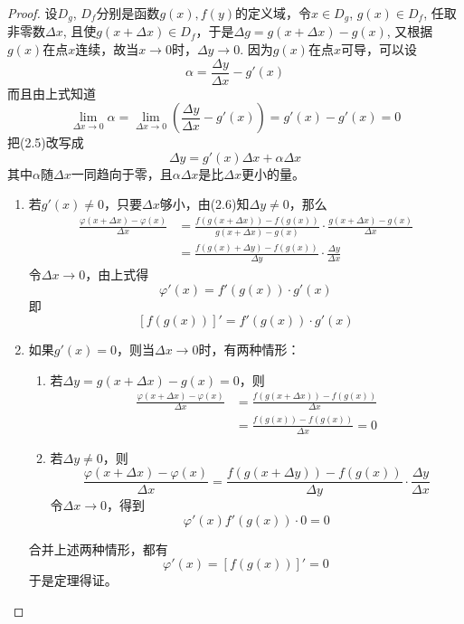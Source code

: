 \begin{proof}
    设$D_g$, $D_f$分别是函数$g(x),f(y)$的定义域，令$x\in D_g$, $g(x)\in D_f$, 任取非零数$\Delta x$, 且使$g(x+\Delta x)\in D_f$，于是$\Delta g=g(x+\Delta x)-g(x)$, 又根据$g(x)$在点$x$连续，故当$x\to 0$时，$\Delta y\to 0$. 因为$g(x)$在点$x$可导，可以设
\begin{equation}
    \alpha=\frac{\Delta y}{\Delta x}-g'(x)
\end{equation}
而且由上式知道
\[\lim_{\Delta x\to 0}\alpha=\lim_{\Delta x\to 0}\left(\frac{\Delta y}{\Delta x}-g'(x)\right)=g'(x)-g'(x)=0\]
把(2.5)改写成
\begin{equation}
    \Delta y=g'(x)\Delta x+\alpha\Delta x
\end{equation}
其中$\alpha$随$\Delta x$一同趋向于零，且$\alpha \Delta x$是比$\Delta x$更小的量。

\begin{enumerate}
    \item 若$g'(x)\ne 0$，只要$\Delta x$够小，由(2.6)知$\Delta y\ne 0$，那么
\[\begin{split}
    \frac{\varphi(x+\Delta x)-\varphi(x)}{\Delta x}&=\frac{f(g(x+\Delta x))-f(g(x))}{g(x+\Delta x)-g(x)}\cdot \frac{g(x+\Delta x)-g(x)}{\Delta x}\\
    &=\frac{f(g(x)+\Delta y)-f(g(x))}{\Delta y}\cdot \frac{\Delta y}{\Delta x}
\end{split}\]
令$\Delta x\to 0$，由上式得
\[\varphi'(x)=f'(g(x))\cdot g'(x)\]
即
\[[f(g(x))]'=f'(g(x))\cdot g'(x)\]

\item 如果$g'(x)=0$，则当$\Delta x\to 0$时，有两种情形：
\begin{enumerate}
    \item 若$\Delta y=g(x+\Delta x)-g(x)=0$，则
\[\begin{split}
    \frac{\varphi(x+\Delta x)-\varphi(x)}{\Delta x}&=\frac{f(g(x+\Delta x))-f(g(x))}{\Delta x}\\
    &=\frac{f(g(x))-f(g(x))}{\Delta x}=0
\end{split}\]
\item 若$\Delta y\ne 0$，则
\[\frac{\varphi(x+\Delta x)-\varphi(x)}{\Delta x}=\frac{f(g(x+\Delta y))-f(g(x))}{\Delta y}\cdot \frac{\Delta y}{\Delta x}\]
令$\Delta x\to 0$，得到
\[\varphi'(x)f'(g(x))\cdot 0=0\]
\end{enumerate}
合并上述两种情形，都有
\[\varphi'(x)=[f(g(x))]'=0\]
于是定理得证。
\end{enumerate}
\end{proof}

